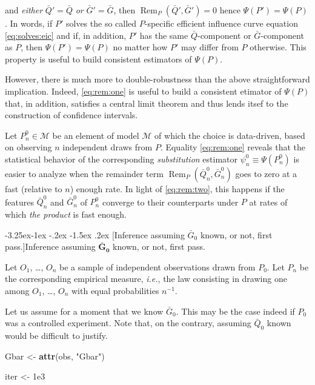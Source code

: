 \documentclass[]{article}
\makeatletter
\newenvironment{Shaded}{\begin{snugshade}}{\end{snugshade}}
\newcommand{\FloatTok}[1]{\textcolor[rgb]{0.00,0.00,0.81}{#1}}
\newcommand{\KeywordTok}[1]{\textcolor[rgb]{0.13,0.29,0.53}{\textbf{#1}}}
\newcommand{\NormalTok}[1]{#1}
\newcommand{\StringTok}[1]{\textcolor[rgb]{0.31,0.60,0.02}{#1}}
\renewcommand\subsection{\@startsection{subsection}{3}{\z@}%
                                     {-3.25ex\@plus -1ex \@minus -.2ex}%
                                     {-1.5ex \@plus .2ex}%
                                     {\normalfont\normalsize\bfseries}}
\DeclareMathOperator{\Rem}{Rem}
\newcommand{\calM}{\mathcal{M}}
\newcommand{\Gbar}{\bar{G}}
\newcommand{\Qbar}{\bar{Q}}
\theoremstyle{definition}
\theoremstyle{definition}
\theoremstyle{definition}
\theoremstyle{remark}
\makeatother
\begin{document}
and \textit{either} \(\Qbar' = \Qbar\) \textit{or} \(\Gbar' = \Gbar\),
then \(\Rem_{P} (\Qbar', \Gbar') = 0\) hence \(\Psi(P') = \Psi(P)\). In
words, if \(P'\) solves the so called \(P\)-specific efficient influence
curve equation \eqref{eq:solves:eic} and if, in addition, \(P'\) has the
same \(\Qbar\)-component or \(\Gbar\)-component as \(P\), then
\(\Psi(P') = \Psi(P)\) no matter how \(P'\) may differ from \(P\)
otherwise. This property is useful to build consistent estimators of
\(\Psi(P)\).

However, there is much more to double-robustness than the above
straightforward implication. Indeed, \ref{eq:rem:one} is useful to build
a consistent etimator of \(\Psi(P)\) that, in addition, satisfies a
central limit theorem and thus lends itsef to the construction of
confidence intervals.

Let \(P_{n}^{0} \in \calM\) be an element of model \(\calM\) of which
the choice is data-driven, based on observing \(n\) independent draws
from \(P\). Equality \ref{eq:rem:one} reveals that the statistical
behavior of the corresponding \textit{substitution} estimator
\(\psi_{n}^{0} \equiv \Psi(P_{n}^{0})\) is easier to analyze when the
remainder term \(\Rem_{P} (\Qbar_{n}^{0}, \Gbar_{n}^{0})\) goes to zero
at a fast (relative to \(n\)) enough rate. In light of \ref{eq:rem:two},
this happens if the features \(\Qbar_{n}^{0}\) and \(\Gbar_{n}^{0}\) of
\(P_{n}^{0}\) converge to their counterparts under \(P\) at rates of
which \textit{the product} is fast enough.

\subsection[Inference assuming $\Gbar_{0}$ known, or not, first pass.]{Inference assuming
$\boldsymbol{\Gbar_{0}}$ known, or not, first pass.} 
\label{subsec:known:gbar:one}

Let \(O_{1}\), \ldots, \(O_{n}\) be a sample of independent observations
drawn from \(P_{0}\). Let \(P_{n}\) be the corresponding empirical
measure, \textit{i.e.}, the law consisting in drawing one among
\(O_{1}\), \ldots, \(O_{n}\) with equal probabilities \(n^{-1}\).

Let us assume for a moment that we know \(\Gbar_{0}\). This may be the
case indeed if \(P_{0}\) was a controlled experiment. Note that, on the
contrary, assuming \(\Qbar_{0}\) known would be difficult to justify.

\begin{Shaded}
\begin{Highlighting}[]
\NormalTok{Gbar <-}\StringTok{ }\KeywordTok{attr}\NormalTok{(obs, }\StringTok{"Gbar"}\NormalTok{)}

\NormalTok{iter <-}\StringTok{ }\FloatTok{1e3}
\end{Highlighting}
\end{Shaded}
\end{document}
